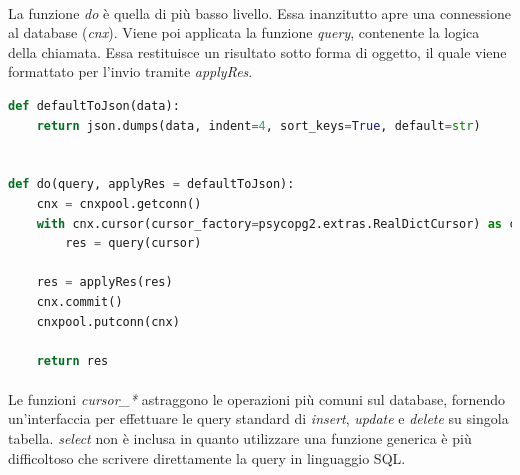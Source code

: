 \documentclass[11pt,a4paper,english]{article}
\begin{document}
\paragraph{} La funzione \emph{do} è quella di più basso livello. Essa inanzitutto apre una connessione al database (\emph{cnx}). Viene poi applicata la funzione \emph{query}, contenente la logica della chiamata. Essa restituisce un risultato sotto forma di oggetto, il quale viene formattato per l'invio tramite \emph{applyRes}.  

\begin{lstlisting}[language=python, caption=Funzione \emph{do}]
def defaultToJson(data):
    return json.dumps(data, indent=4, sort_keys=True, default=str)


def do(query, applyRes = defaultToJson):
    cnx = cnxpool.getconn()
    with cnx.cursor(cursor_factory=psycopg2.extras.RealDictCursor) as cursor:
        res = query(cursor)

    res = applyRes(res)
    cnx.commit()
    cnxpool.putconn(cnx)

    return res
\end{lstlisting}

\paragraph{} Le funzioni \emph{cursor\_*} astraggono le operazioni più comuni sul database, fornendo un'interfaccia per effettuare le query standard di \emph{insert}, \emph{update} e \emph{delete} su singola tabella. \emph{select} non è inclusa in quanto utilizzare una funzione generica è più difficoltoso che scrivere direttamente la query in linguaggio SQL. 
\end{document}
